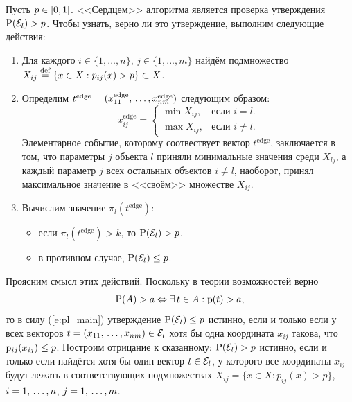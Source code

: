 Пусть $p \in [0,1]$. <<Сердцем>> алгоритма является проверка утверждения ${\mathrm{P}}(\mathcal{E}_l) > p$. Чтобы узнать, верно ли это утверждение, выполним следующие действия: 
\begin{enumerate}
  \item 
  Для каждого $i \in \{1, ..., n\}$, $j \in \{1, ..., m\}$ найдём подмножество $X_{ij} \overset{\text{def}}{=} \{x \in X: p_{ij}(x) > p\} \subset X$. 
  \item 
  Определим $t^\text{edge} = (x_{11}^\text{edge}, \, \ldots, x_{nm}^\text{edge})$ следующим образом:
  \begin{equation*}
    x_{ij}^\text{edge} =
    \begin{cases}
      \min X_{ij}, &\text{если $i = l$.}\\
      \max X_{ij}, &\text{если $i \neq l$.} 
    \end{cases}
  \end{equation*}
  Элементарное событие, которому соотвествует вектор $t^\text{edge}$, заключается в том, что параметры $j$ объекта $l$ приняли минимальные значения среди $X_{lj}$, а каждый параметр $j$ всех остальных объектов $i \neq l$, наоборот, принял максимальное значение в <<своём>> множестве $X_{ij}$. 
  \item	%
  Вычислим значение $\pi_l(t^\text{edge})$: 
 	\begin{itemize}
		\item если $\pi_l(t^\text{edge}) > k$, то ${\mathrm{P}}(\mathcal{E}_l) > p$.
		\item в противном случае, ${\mathrm{P}}(\mathcal{E}_l) \leq p$.
	\end{itemize} 
\end{enumerate}  

Проясним смысл этих действий. Поскольку в теории возможностей верно
\begin{equation*}
  {\mathrm{P}}(A) > a \Leftrightarrow \exists\, t \in A: {\mathrm{p}}(t) > a,
\end{equation*}
то в силу (\ref{e:pl_main}) утверждение ${\mathrm{P}}(\mathcal{E}_l) \leq p$ истинно, если и только если у всех векторов $t = (x_{11}, \, \ldots, x_{nm}) \in \mathcal{E}_l$ хотя бы одна координата $x_{ij}$ такова, что ${\mathrm{p}}_{ij}(x_{ij}) \leq p$. Построим отрицание к сказанному: ${\mathrm{P}}(\mathcal{E}_l) > p$ истинно, если и только если найдётся хотя бы один вектор $t \in \mathcal{E}_l$, у которого все координаты $x_{ij} $ будут лежать в соответствующих подмножествах $X_{ij} = \{x \in X: p_{ij}(x) > p\}$, $i = 1,\, \ldots, n$, $j = 1,\, \ldots, m$.

